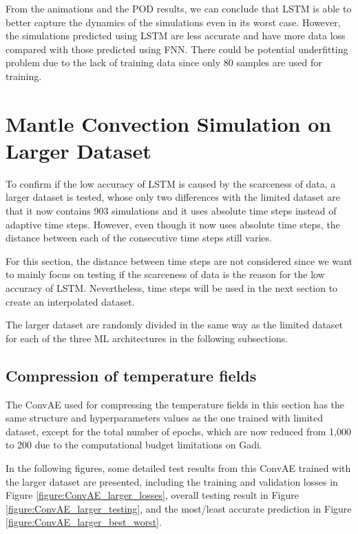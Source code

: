 From the animations and the POD results, we can conclude that LSTM is able to better capture the dynamics of the simulations even in its worst case. However, the simulations predicted using LSTM are less accurate and have more data loss compared with those predicted using FNN. There could be potential underfitting problem due to the lack of training data since only 80 samples are used for training.


\section{Mantle Convection Simulation on Larger Dataset}

To confirm if the low accuracy of LSTM is caused by the scarceness of data, a larger dataset is tested, whose only two differences with the limited dataset are that it now contains 903 simulations and it uses absolute time steps instead of adaptive time steps. However, even though it now uses absolute time steps, the distance between each of the consecutive time steps still varies.

For this section, the distance between time steps are not considered since we want to mainly focus on testing if the scarceness of data is the reason for the low accuracy of LSTM. Nevertheless, time steps will be used in the next section to create an interpolated dataset.

The larger dataset are randomly divided in the same way as the limited dataset for each of the three ML architectures in the following subsections.

\subsection{Compression of temperature fields}

The ConvAE used for compressing the temperature fields in this section has the same structure and hyperparameters values as the one trained with limited dataset, except for the total number of epochs, which are now reduced from 1,000 to 200 due to the computational budget limitations on Gadi.

In the following figures, some detailed test results from this ConvAE trained with the larger dataset are presented, including the training and validation losses in Figure \ref{figure:ConvAE_larger_losses}, overall testing result in Figure \ref{figure:ConvAE_larger_testing}, and the most/least accurate prediction in Figure \ref{figure:ConvAE_larger_best_worst}.

